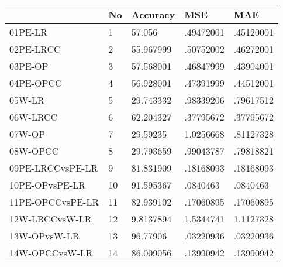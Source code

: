 \begin{table}[htbp]
\begin{tabular}{|l|l|l|l|l|}\hline  
 & No  & Accuracy  & MSE  & MAE  \\ \hline  
01PE-LR & 1 & 57.056 & .49472001 & .45120001 \\ \hline 
02PE-LRCC & 2 & 55.967999 & .50752002 & .46272001 \\ \hline 
03PE-OP & 3 & 57.568001 & .46847999 & .43904001 \\ \hline 
04PE-OPCC & 4 & 56.928001 & .47391999 & .44512001 \\ \hline 
05W-LR & 5 & 29.743332 & .98339206 & .79617512 \\ \hline 
06W-LRCC & 6 & 62.204327 & .37795672 & .37795672 \\ \hline 
07W-OP & 7 & 29.59235 & 1.0256668 & .81127328 \\ \hline 
08W-OPCC & 8 & 29.793659 & .99043787 & .79818821 \\ \hline 
09PE-LRCCvsPE-LR & 9 & 81.831909 & .18168093 & .18168093 \\ \hline 
10PE-OPvsPE-LR & 10 & 91.595367 & .0840463 & .0840463 \\ \hline 
11PE-OPCCvsPE-LR & 11 & 82.939102 & .17060895 & .17060895 \\ \hline 
12W-LRCCvsW-LR & 12 & 9.8137894 & 1.5344741 & 1.1127328 \\ \hline 
13W-OPvsW-LR & 13 & 96.77906 & .03220936 & .03220936 \\ \hline 
14W-OPCCvsW-LR & 14 & 86.009056 & .13990942 & .13990942 \\ \hline 
  \end{tabular}
\end{table}
